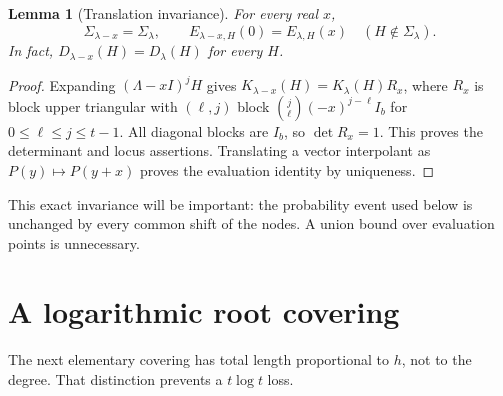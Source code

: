 \documentclass[11pt]{article}
\numberwithin{equation}{section}
\newtheorem{lemma}[theorem]{Lemma}
\theoremstyle{definition}
\begin{document}
\begin{lemma}[Translation invariance]\label{lem:translation}
For every real $x$,
\begin{equation}\label{eq:translation}
\Sigma_{\lambda-x}=\Sigma_\lambda,
\qquad E_{\lambda-x,H}(0)=E_{\lambda,H}(x)
\quad(H\notin\Sigma_\lambda).
\end{equation}
In fact, $D_{\lambda-x}(H)=D_\lambda(H)$ for every $H$.
\end{lemma}
\begin{proof}
Expanding $(\Lambda-xI)^jH$ gives
$K_{\lambda-x}(H)=K_\lambda(H)R_x$, where $R_x$ is block upper triangular with $(\ell,j)$ block
$\binom{j}{\ell}(-x)^{j-\ell}I_b$ for $0\le\ell\le j\le t-1$.
All diagonal blocks are $I_b$, so $\det R_x=1$. This proves the determinant and locus assertions. Translating a vector interpolant as $P(y)\mapsto P(y+x)$ proves the evaluation identity by uniqueness.
\end{proof}

This exact invariance will be important: the probability event used below is unchanged by every common shift of the nodes. A union bound over evaluation points is unnecessary.

\section{A logarithmic root covering}\label{sec:cover}
The next elementary covering has total length proportional to $h$, not to the degree. That distinction prevents a $t\log t$ loss.
\end{document}
